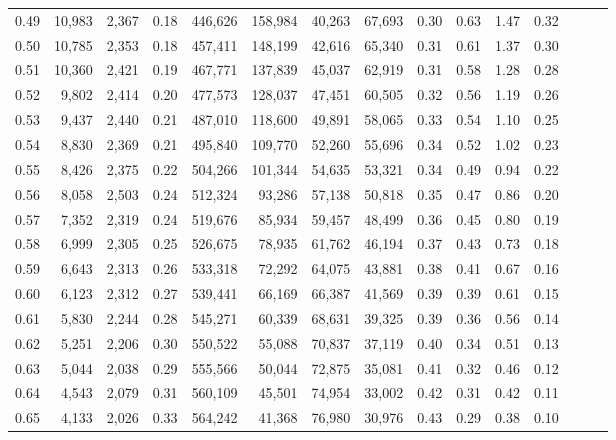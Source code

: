 \begin{tabular}{rrrrrrrrrrrrrrr}
0.49 &  10,983 &  2,367 &  0.18 &  446,626 &  158,984 &   40,263 &   67,693 &  0.30 &  0.63 &  1.47 &      0.32 \\
0.50 &  10,785 &  2,353 &  0.18 &  457,411 &  148,199 &   42,616 &   65,340 &  0.31 &  0.61 &  1.37 &      0.30 \\
0.51 &  10,360 &  2,421 &  0.19 &  467,771 &  137,839 &   45,037 &   62,919 &  0.31 &  0.58 &  1.28 &      0.28 \\
0.52 &   9,802 &  2,414 &  0.20 &  477,573 &  128,037 &   47,451 &   60,505 &  0.32 &  0.56 &  1.19 &      0.26 \\
0.53 &   9,437 &  2,440 &  0.21 &  487,010 &  118,600 &   49,891 &   58,065 &  0.33 &  0.54 &  1.10 &      0.25 \\
0.54 &   8,830 &  2,369 &  0.21 &  495,840 &  109,770 &   52,260 &   55,696 &  0.34 &  0.52 &  1.02 &      0.23 \\
0.55 &   8,426 &  2,375 &  0.22 &  504,266 &  101,344 &   54,635 &   53,321 &  0.34 &  0.49 &  0.94 &      0.22 \\
0.56 &   8,058 &  2,503 &  0.24 &  512,324 &   93,286 &   57,138 &   50,818 &  0.35 &  0.47 &  0.86 &      0.20 \\
0.57 &   7,352 &  2,319 &  0.24 &  519,676 &   85,934 &   59,457 &   48,499 &  0.36 &  0.45 &  0.80 &      0.19 \\
0.58 &   6,999 &  2,305 &  0.25 &  526,675 &   78,935 &   61,762 &   46,194 &  0.37 &  0.43 &  0.73 &      0.18 \\
0.59 &   6,643 &  2,313 &  0.26 &  533,318 &   72,292 &   64,075 &   43,881 &  0.38 &  0.41 &  0.67 &      0.16 \\
0.60 &   6,123 &  2,312 &  0.27 &  539,441 &   66,169 &   66,387 &   41,569 &  0.39 &  0.39 &  0.61 &      0.15 \\
0.61 &   5,830 &  2,244 &  0.28 &  545,271 &   60,339 &   68,631 &   39,325 &  0.39 &  0.36 &  0.56 &      0.14 \\
0.62 &   5,251 &  2,206 &  0.30 &  550,522 &   55,088 &   70,837 &   37,119 &  0.40 &  0.34 &  0.51 &      0.13 \\
0.63 &   5,044 &  2,038 &  0.29 &  555,566 &   50,044 &   72,875 &   35,081 &  0.41 &  0.32 &  0.46 &      0.12 \\
0.64 &   4,543 &  2,079 &  0.31 &  560,109 &   45,501 &   74,954 &   33,002 &  0.42 &  0.31 &  0.42 &      0.11 \\
0.65 &   4,133 &  2,026 &  0.33 &  564,242 &   41,368 &   76,980 &   30,976 &  0.43 &  0.29 &  0.38 &      0.10 \\

\end{tabular}
